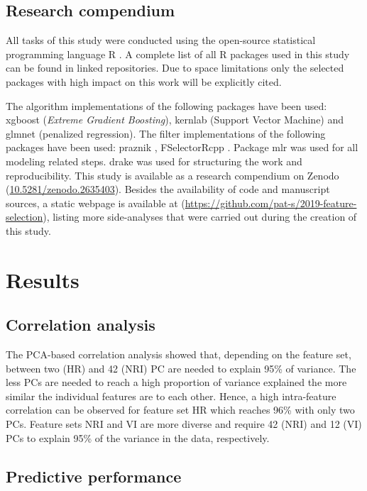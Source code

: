 \documentclass[peerreview]{IEEEtran}
\begin{document}
\subsection{Research compendium}

All tasks of this study were conducted using the open-source statistical programming language R \cite{rcoreteam2019}.
A complete list of all R packages used in this study can be found in linked repositories.
Due to space limitations only the selected packages with high impact on this work will be explicitly cited.

The algorithm implementations of the following packages have been used: xgboost \cite{chen2016} (\textit{Extreme Gradient Boosting}), kernlab \cite{kernlab} (Support Vector Machine) and glmnet \cite{glmnet} (penalized regression).
The filter implementations of the following packages have been used: praznik \cite{praznik}, FSelectorRcpp \cite{fselectorrcpp}.
Package mlr \cite{mlr} was used for all modeling related steps.
drake \cite{drake} was used for structuring the work and reproducibility.
This study is available as a research compendium on Zenodo (\url{10.5281/zenodo.2635403}).
Besides the availability of code and manuscript sources, a static webpage is available at (\url{https://github.com/pat-s/2019-feature-selection}), listing more side-analyses that were carried out during the creation of this study.

\section{Results}

\subsection{Correlation analysis}

The PCA-based correlation analysis showed that, depending on the feature set, between two (HR) and 42 (NRI) \ac{PC} are needed to explain 95\% of variance.
The less PCs are needed to reach a high proportion of variance explained the more similar the individual features are to each other.
Hence, a high intra-feature correlation can be observed for feature set HR which reaches 96\% with only two PCs.
Feature sets NRI and VI are more diverse and require 42 (NRI) and 12 (VI) PCs to explain 95\% of the variance in the data, respectively.

\subsection{Predictive performance}
\end{document}
